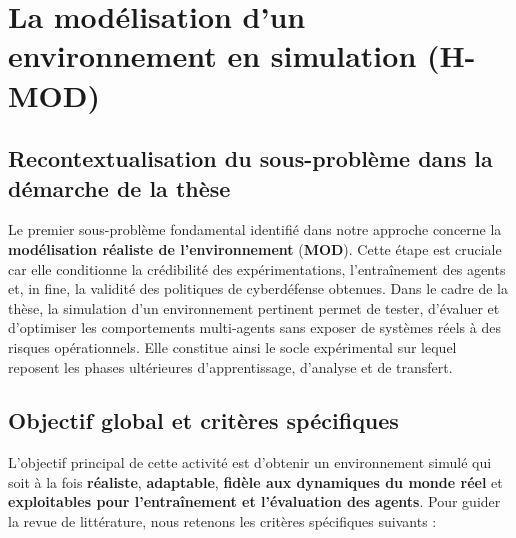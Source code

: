 \section{La modélisation d'un environnement en simulation (H-MOD)}

\subsection*{Recontextualisation du sous-problème dans la démarche de la thèse}

Le premier sous-problème fondamental identifié dans notre approche concerne la \textbf{modélisation réaliste de l’environnement} (\textbf{MOD}). Cette étape est cruciale car elle conditionne la crédibilité des expérimentations, l’entraînement des agents et, in fine, la validité des politiques de cyberdéfense obtenues. Dans le cadre de la thèse, la simulation d’un environnement pertinent permet de tester, d’évaluer et d’optimiser les comportements multi-agents sans exposer de systèmes réels à des risques opérationnels. Elle constitue ainsi le socle expérimental sur lequel reposent les phases ultérieures d’apprentissage, d’analyse et de transfert. \subsection*{Objectif global et critères spécifiques} L’objectif principal de cette activité est d’obtenir un environnement simulé qui soit à la fois \textbf{réaliste}, \textbf{adaptable}, \textbf{fidèle aux dynamiques du monde réel} et \textbf{exploitables pour l’entraînement et l’évaluation des agents}. Pour guider la revue de littérature, nous retenons les critères spécifiques suivants :
%
